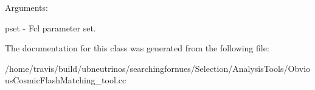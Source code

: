 Arguments\+:

pset -\/ Fcl parameter set. 

The documentation for this class was generated from the following file\+:\begin{DoxyCompactItemize}
\item 
/home/travis/build/ubneutrinos/searchingfornues/\+Selection/\+Analysis\+Tools/Obvious\+Cosmic\+Flash\+Matching\+\_\+tool.\+cc\end{DoxyCompactItemize}
